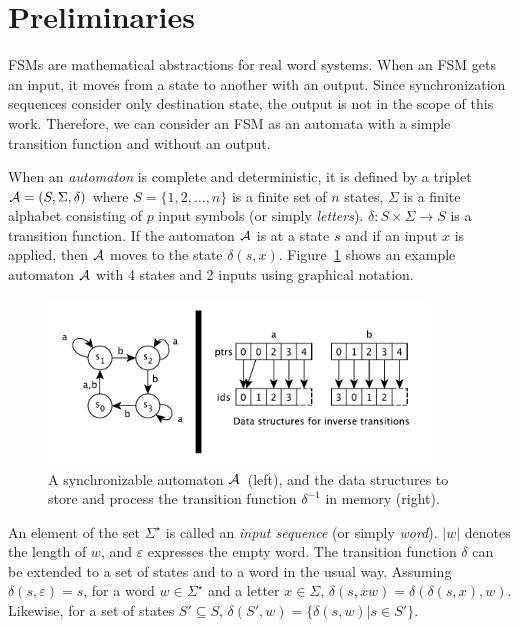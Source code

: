 \documentclass[12pt]{article}
\begin{document}
\clearpage
\section{Preliminaries}
\label{sec:Preliminaries}
FSMs are mathematical abstractions for real word systems. When an FSM gets an input, it moves from a state to another with an output. Since synchronization sequences consider only destination state, the output is not in the scope of this work. Therefore, we can consider an FSM as an automata with a simple transition function and without an output.

When an {\em automaton} is complete and deterministic, it is defined by a triplet ${\cal A}=(S, \Sigma, \delta)$  where $S = \{1, 2, \ldots, n\}$ is a finite set of $n$ states, $\Sigma$ is a finite alphabet consisting of $p$ input symbols (or simply {\em letters}). $\delta : S \times \Sigma \rightarrow S$ is a transition function. If the automaton ${\cal A}$ is at a state $s$ and if an input $x$ is applied, then ${\cal A}$ moves to the state $\delta(s,x)$. Figure~\ref{fig:inv} shows an example automaton ${\cal A}$ with 4 states and 2 inputs using graphical notation.

\begin{figure}[ht]
	\centering
	\includegraphics[width=0.9\textwidth]{figs/inverse.pdf}
	\caption{A synchronizable automaton ${\cal A}$~(left), and the data structures to store and process the transition function $\delta^{-1}$  in memory (right).}
	\label{fig:inv}
\end{figure}

An element of the set $\Sigma^\star$ is called an {\em input sequence} (or simply {\em word}). $|w|$ denotes the length of $w$, and $\varepsilon$ expresses the empty word. The transition function $\delta$ can be extended to a set of states and to a word in the usual way. Assuming $\delta(s,\varepsilon)=s$, for a word $w \in \Sigma^\star$ and a letter $x \in \Sigma$, $\delta(s,xw) = \delta(\delta(s,x),w)$. Likewise, for a set of states $S' \subseteq S$, $\delta(S',w) = \{ \delta(s,w) | s \in S'\}$.
\end{document}
